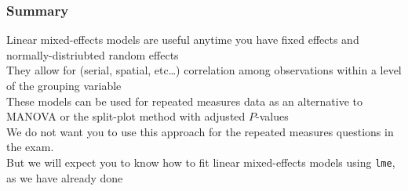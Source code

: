 \documentclass[color=usenames,dvipsnames]{beamer}\usepackage[]{graphicx}\usepackage[]{color}
\begin{document}
\begin{frame}
  \frametitle{Summary}
  \large
  Linear mixed-effects models are useful anytime you have
  fixed effects and normally-distriubted random effects \\
  \pause
  \vfill
  They allow for (serial, spatial, etc\dots) correlation among
  observations within a level of the grouping variable \\
  \pause
  \vfill
  These models can be used for repeated measures data as an
  alternative to MANOVA or the split-plot method with adjusted
  $P$-values \\
  \pause
  \vfill
  We do not want you to use this approach for the repeated
  measures questions in the exam. \\
  \pause
  \vfill
  But we will expect you to know how to fit linear
      mixed-effects models using {\tt lme}, as we have already done
\end{frame}
\end{document}
